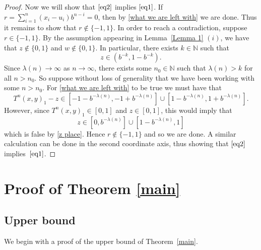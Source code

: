 \documentclass[12pt]{article}
\theoremstyle{remark}
\numberwithin{equation}{section}
\renewcommand{\Bbb}[1]{\mathbb{#1}}
\newcommand{\N}{{\Bbb N}}         %
\newcommand{\0}{\mathbf{0}}
\begin{document}
\begin{proof}
Now we will show that $\eqref{eq2}$ implies $\eqref{eq1}$. If $r=\sum_{i=1}^{n}(x_{i}-u_{i})b^{n-i}=0$, then by \eqref{what we are left with} we are done. Thus it remains to show that $r \not \in \{-1,1\}$. In order to reach a contradiction, suppose \mbox{$r\in\{-1,1\}$}.  By the assumption appearing in Lemma~\ref{Lemma 1} $(i)$, we have that $z\not\in\{0,1\}$ and \mbox{$w\not\in\{0,1\}$}. In particular, there exists $k\in\N$ such that
\begin{equation}\label{z place}
z\in (b^{-k},1-b^{-k}).
\end{equation}
Since $\lambda(n) \to \infty$ as $n\to \infty$, there exists some $n_{0} \in \N$ such that $\lambda(n)>k$ for all $n>n_{0}$. So suppose without loss of generality that we have been working with some $n>n_{0}$. For \eqref{what we are left with} to be true we must have that 
\begin{equation*}
T^{n}(x,y)_{1}-z \in [-1-b^{-\lambda(n)},-1+b^{-\lambda(n)}] \cup [1-b^{-\lambda(n)},1+b^{-\lambda(n)}].
\end{equation*}
However, since $T^{n}(x,y)_{1} { \in [0,1]}$ {and} $z \in [0,1]$, this would imply that 
\[z \in[0,b^{-\lambda(n)}]\cup [1- b^{-\lambda(n)},1]\] 
which is false by \eqref{z place}.  Hence $r \not \in \{-1,1\}$ and so we are done. A similar calculation can be done in the second coordinate axis, thus showing that $\eqref{eq2}$ implies~$\eqref{eq1}$.
\end{proof}

 
 \section{Proof of Theorem \ref{main}} \label{proof}
 \subsection{Upper bound} \label{upperbound}

We begin with a proof of the upper bound of Theorem~\ref{main}. 
\end{document}
